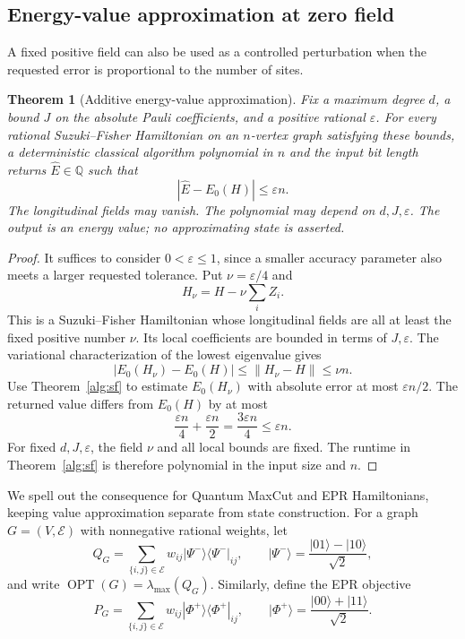 \documentclass[reqno]{amsart}
\newtheorem{theorem}{Theorem}[section]
\theoremstyle{definition}
\theoremstyle{remark}
\begin{document}
\subsection{Energy-value approximation at zero field}
\label{alg:value-subsection}

A fixed positive field can also be used as a controlled
perturbation when the requested error is proportional to the
number of sites.

\begin{theorem}[Additive energy-value approximation]
\label{alg:value}
Fix a maximum degree \(d\), a bound \(J\) on the absolute
Pauli coefficients, and a positive rational \(\varepsilon\).
For every rational Suzuki--Fisher Hamiltonian on an
\(n\)-vertex graph satisfying these bounds, a deterministic
classical algorithm polynomial in \(n\) and the input bit length
returns \(\widehat E\in\mathbb Q\) such that
\[
 |\widehat E-E_0(H)|\le\varepsilon n.
 \]
The longitudinal fields may vanish.
The polynomial may depend on \(d,J,\varepsilon\).
The output is an energy value; no approximating state is
asserted.
\end{theorem}

\begin{proof}
It suffices to consider \(0<\varepsilon\le1\), since a smaller
accuracy parameter also meets a larger requested tolerance.
Put \(\nu=\varepsilon/4\) and
\[
 H_\nu=H-\nu\sum_i Z_i.
 \]
This is a Suzuki--Fisher Hamiltonian whose longitudinal fields
are all at least the fixed positive number \(\nu\).
Its local coefficients are bounded in terms of \(J,\varepsilon\).
The variational characterization of the lowest eigenvalue gives
\[
 |E_0(H_\nu)-E_0(H)|
 \le\|H_\nu-H\|\le\nu n.
 \]
Use Theorem~\ref{alg:sf} to estimate \(E_0(H_\nu)\) with
absolute error at most \(\varepsilon n/2\).
The returned value differs from \(E_0(H)\) by at most
\[
 \frac{\varepsilon n}{4}+\frac{\varepsilon n}{2}
   =\frac{3\varepsilon n}{4}
   \le\varepsilon n.
 \]
For fixed \(d,J,\varepsilon\), the field \(\nu\) and all local
bounds are fixed.  The runtime in Theorem~\ref{alg:sf} is
therefore polynomial in the input size and \(n\).
\end{proof}

We spell out the consequence for Quantum MaxCut and EPR
Hamiltonians, keeping value approximation separate from state
construction.
For a graph \(G=(V,\mathcal E)\) with nonnegative rational weights, let
\[
 Q_G=\sum_{\{i,j\}\in\mathcal E}
      w_{ij}|\Psi^-\rangle\langle\Psi^-|_{ij},
 \qquad
 |\Psi^-\rangle=\frac{|01\rangle-|10\rangle}{\sqrt2},
 \]
and write \(\operatorname{OPT}(G)=\lambda_{\max}(Q_G)\).
Similarly, define the EPR objective
\[
 P_G=\sum_{\{i,j\}\in\mathcal E}
      w_{ij}|\Phi^+\rangle\langle\Phi^+|_{ij},
 \qquad
 |\Phi^+\rangle=\frac{|00\rangle+|11\rangle}{\sqrt2}.
 \]
\end{document}

